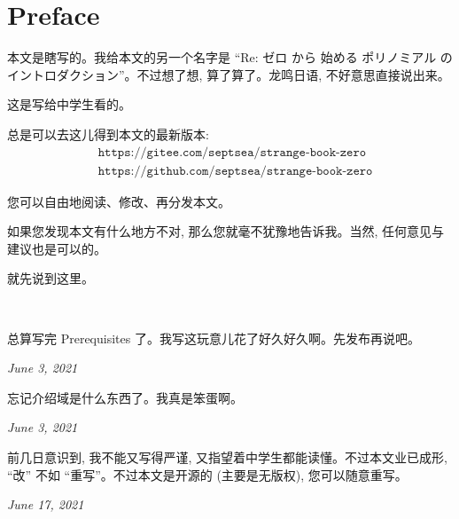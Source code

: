\section*{Preface}

\def\period{。}

本文是瞎写的\period 我给本文的另一个名字是 ``Re: ゼロ から 始める ポリノミアル の イントロダクション''\period 不过想了想, 算了算了\period 龙鸣日语, 不好意思直接说出来\period

这是写给中学生看的\period

总是可以去这儿得到本文的最新版本:
\begin{align*}
     & \texttt{https://gitee.com/septsea/strange-book-zero}  \\
     & \texttt{https://github.com/septsea/strange-book-zero}
\end{align*}

您可以自由地阅读、修改、再分发本文\period

如果您发现本文有什么地方不对, 那么您就毫不犹豫地告诉我\period 当然, 任何意见与建议也是可以的\period

就先说到这里\period

\ \

\providecommand{\appendDate}{}
\renewcommand{\appendDate}[1]{\par \hfill {\itshape \sffamily #1}}

\begin{remark}
    总算写完 Prerequisites 了\period 我写这玩意儿花了好久好久啊\period 先发布再说吧\period
    \appendDate{June 3, 2021}
\end{remark}

\begin{remark}
    忘记介绍域是什么东西了\period 我真是笨蛋啊\period
    \appendDate{June 3, 2021}
\end{remark}

\begin{remark}
    前几日意识到, 我不能又写得严谨, 又指望着中学生都能读懂\period 不过本文业已成形, ``改'' 不如 ``重写''\period 不过本文是开源的 (主要是无版权), 您可以随意重写\period
    \appendDate{June 17, 2021}
\end{remark}

\def\period{\text{。}}
